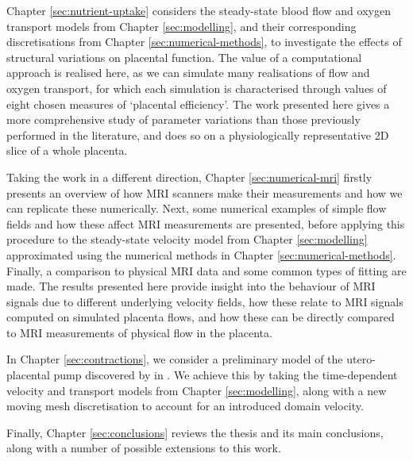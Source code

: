         Chapter \ref{sec:nutrient-uptake} considers the steady-state blood flow and oxygen transport models from Chapter \ref{sec:modelling}, and their corresponding discretisations from Chapter \ref{sec:numerical-methods}, to investigate the effects of structural variations on placental function. The value of a computational approach is realised here, as we can simulate many realisations of flow and oxygen transport, for which each simulation is characterised through values of eight chosen measures of `placental efficiency'. The work presented here gives a more comprehensive study of parameter variations than those previously performed in the literature, and does so on a physiologically representative 2D slice of a whole placenta.

        Taking the work in a different direction, Chapter \ref{sec:numerical-mri} firstly presents an overview of how MRI scanners make their measurements and how we can replicate these numerically. Next, some numerical examples of simple flow fields and how these affect MRI measurements are presented, before applying this procedure to the steady-state velocity model from Chapter \ref{sec:modelling} approximated using the numerical methods in Chapter \ref{sec:numerical-methods}. Finally, a comparison to physical MRI data and some common types of fitting are made. The results presented here provide insight into the behaviour of MRI signals due to different underlying velocity fields, how these relate to MRI signals computed on simulated placenta flows, and how these can be directly compared to MRI measurements of physical flow in the placenta.

        In Chapter \ref{sec:contractions}, we consider a preliminary model of the utero-placental pump discovered by \citeauthor{dellschaftHaemodynamicsHumanPlacenta2020} \cite{dellschaftHaemodynamicsHumanPlacenta2020} in \citeyear{dellschaftHaemodynamicsHumanPlacenta2020}. We achieve this by taking the time-dependent velocity and transport models from Chapter \ref{sec:modelling}, along with a new moving mesh discretisation to account for an introduced domain velocity.

        Finally, Chapter \ref{sec:conclusions} reviews the thesis and its main conclusions, along with a number of possible extensions to this work.